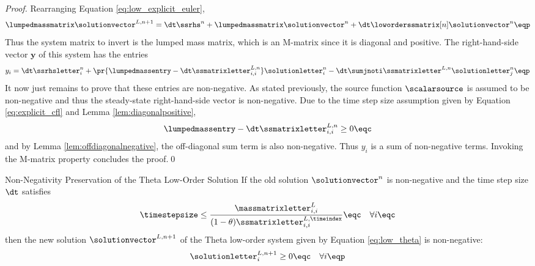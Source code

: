 \begin{proof}
Rearranging Equation \eqref{eq:low_explicit_euler},
\[
  \lumpedmassmatrix\solutionvector^{L,n+1}
    = \dt\ssrhs^n
      + \lumpedmassmatrix\solutionvector^{n}
      + \dt\loworderssmatrix[n]\solutionvector^{n}
  \eqp
\]
Thus the system matrix to invert is the lumped mass matrix, which is
an M-matrix since it is diagonal and positive. The right-hand-side
vector $\mathbf{y}$ of this system has the entries
\[
  y_i
    = \dt\ssrhsletter^n_i
      + \pr{\lumpedmassentry - \dt\ssmatrixletter^{L,n}_{i,i}}
        \solutionletter^n_i
      - \dt\sumjnoti\ssmatrixletter^{L,n}\solutionletter^n_j
  \eqp
\]
It now just remains to prove that these entries are non-negative.
As stated previously, the source function $\scalarsource$ is assumed
to be non-negative and thus the steady-state right-hand-side
vector is non-negative. Due to the time step size assumption
given by Equation \eqref{eq:explicit_cfl} and Lemma \ref{lem:diagonalpositive},
\[
  \lumpedmassentry - \dt\ssmatrixletter^{L,n}_{i,i} \geq 0 \eqc
\]
and by Lemma \ref{lem:offdiagonalnegative}, the off-diagonal
sum term is also non-negative. Thus $y_i$ is a sum of non-negative
terms. Invoking the M-matrix property concludes the proof.\qed
\end{proof}
\begin{theorem}{Non-Negativity Preservation of the Theta Low-Order Solution}
  If the old solution $\solutionvector^n$ is non-negative and
  the time step size $\dt$ satisfies
\begin{equation}\label{eq:theta_cfl}
   \timestepsize \leq \frac{\massmatrixletter^L_{i,i}}{(1-\theta)
     \ssmatrixletter_{i,i}^{L,\timeindex}}
   \eqc\quad\forall i \eqc
\end{equation}
  then the new solution $\solutionvector^{L,n+1}$ of the Theta low-order
  system given by Equation \eqref{eq:low_theta} is non-negative:
  \[
    \solutionletter^{L,n+1}_i \geq 0 \eqc \quad \forall i\eqp
  \]
\end{theorem}

